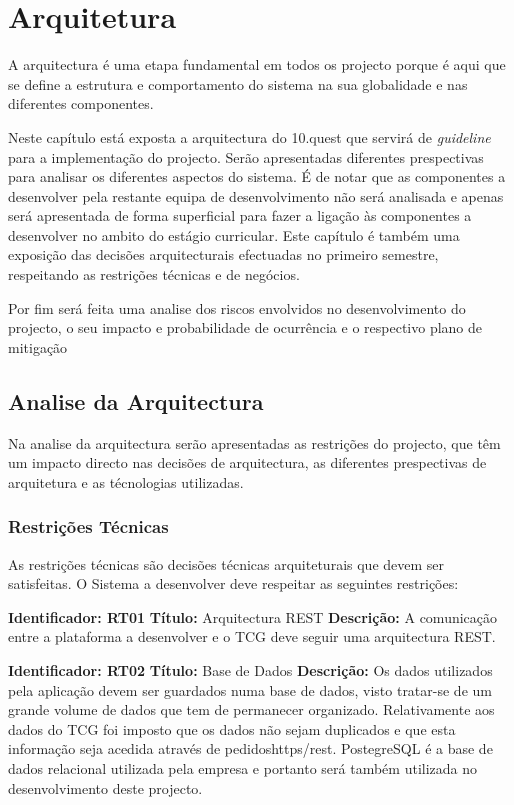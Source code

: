 
\chapter{Arquitetura}
\label{sec:arquitetura}

A arquitectura é uma etapa fundamental em todos os projecto porque é aqui que se define a estrutura e comportamento do sistema na sua globalidade e nas diferentes componentes.

Neste capítulo está exposta a arquitectura do 10.quest que servirá de \textit{guideline} para a implementação do projecto. Serão apresentadas diferentes prespectivas para analisar os diferentes aspectos do sistema. É de notar que as componentes a desenvolver pela restante equipa de desenvolvimento não será analisada e apenas será apresentada de forma superficial para fazer a ligação às componentes a desenvolver no ambito do estágio curricular.
Este capítulo é também uma exposição das decisões arquitecturais efectuadas no primeiro semestre, respeitando as restrições técnicas e de negócios.

Por fim será feita uma analise dos riscos envolvidos no desenvolvimento do projecto, o seu impacto e probabilidade de ocurrência e o respectivo plano de mitigação




\section{Analise da Arquitectura}
\label{analisearq}

Na analise da arquitectura serão apresentadas as restrições do projecto, que têm um impacto directo nas decisões de arquitectura, as diferentes prespectivas de arquitetura e as técnologias utilizadas.

\subsection{Restrições Técnicas}
As restrições técnicas são decisões técnicas arquiteturais que devem ser satisfeitas. O Sistema a desenvolver deve respeitar as seguintes restrições:

\textbf{Identificador: RT01}
\newline
\textbf{Título:} Arquitectura REST
\newline
\textbf{Descrição:} A comunicação entre a plataforma a desenvolver e o TCG deve seguir uma arquitectura REST.

\textbf{Identificador: RT02}
\newline
\textbf{Título:} Base de Dados
\newline
\textbf{Descrição:} Os dados utilizados pela aplicação devem ser guardados numa base de dados, visto tratar-se de um grande volume de dados que tem de permanecer organizado. Relativamente aos dados do TCG foi imposto que os dados não sejam duplicados e que esta informação seja acedida através de pedidos\acrshort{https}/\acrshort{rest}. PostegreSQL\cite{sql} é a base de dados relacional utilizada pela empresa e portanto será também utilizada no desenvolvimento deste projecto.

